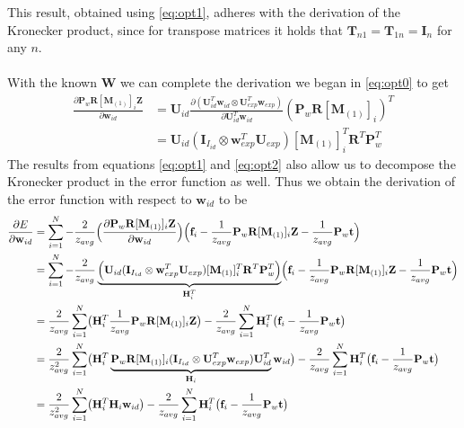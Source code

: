 \documentclass[11pt,a4paper,twoside]{report}
\begin{document}
This result, obtained using \ref{eq:opt1}, adheres with the derivation of
the Kronecker product, since for transpose matrices it holds that $\mathbf{T}_{n1} =
\mathbf{T}_{1n} = \mathbf{I}_n$ for any $n$.\\
\\
With the known $\mathbf{W}$ we can complete the derivation we began in \ref{eq:opt0} to get
\begin{align}
\frac
{\partial 
\mathbf{P}_w\mathbf{R}[\mathbf{M}_{(1)}]_{i}\mathbf{Z}
}
{\partial
\mathbf{w}_{id}
}
&=\mathbf{U}_{id}
\frac
{\partial
(\mathbf{U}_{id}^T\mathbf{w}_{id} \otimes \mathbf{U}_{exp}^T\mathbf{w}_{exp})
}
{\partial
\mathbf{U}_{id}^T\mathbf{w}_{id}
}
(\mathbf{P}_w\mathbf{R}[\mathbf{M}_{(1)}]_{i})^T\nonumber\\
&=
\mathbf{U}_{id}
(\mathbf{I}_{I_{id}} \otimes
\mathbf{w}_{exp}^T\mathbf{U}_{exp})
[\mathbf{M}_{(1)}]_{i}^T\mathbf{R}^T\mathbf{P}_w^T
\end{align}
The results from equations \ref{eq:opt1} and \ref{eq:opt2} also allow us to decompose the Kronecker product
in the error function as well. Thus we obtain the derivation of the error function with respect to
$\mathbf{w}_{id}$ to be
\begin{align*}\label{eq:opt4}
\frac{\partial E}{\partial \mathbf{w}_{id}} &= \sum_{i=1}^N -\frac{2}{z_{avg}}\Bigl(
\frac{\partial \mathbf{P}_w\mathbf{R}[\mathbf{M}_{(1)}]_{i}\mathbf{Z}}
{\partial \mathbf{w}_{id}}\Bigr)\Bigl(\mathbf{f}_i - \frac{1}{z_{avg}}\mathbf{P}_w\mathbf{R}[\mathbf{M}_{(1)}]_{i}\mathbf{Z} - \frac{1}{z_{avg}}\mathbf{P}_w\mathbf{t}\Bigr)\\
&=\sum_{i=1}^N -\frac{2}{z_{avg}}\underbrace{\Bigl(\mathbf{U}_{id} (\mathbf{I}_{I_{id}} \otimes \mathbf{w}_{exp}^T\mathbf{U}_{exp}) [\mathbf{M}_{(1)}]_{i}^T\mathbf{R}^T\mathbf{P}_w^T\Bigr)}_{\mathbf{H}_i^T}\Bigl(\mathbf{f}_i - \frac{1}{z_{avg}}\mathbf{P}_w\mathbf{R}[\mathbf{M}_{(1)}]_{i}\mathbf{Z} - \frac{1}{z_{avg}}\mathbf{P}_w\mathbf{t}
\Bigr)\\
&= \frac{2}{z_{avg}}\sum_{i=1}^N\bigl(
\mathbf{H}_i^T\frac{1}{z_{avg}}\mathbf{P}_w\mathbf{R}[\mathbf{M}_{(1)}]_{i}\mathbf{Z}\bigr)
-
\frac{2}{z_{avg}}\sum_{i=1}^N \mathbf{H}_i^T\bigl(\mathbf{f}_i - \frac{1}{z_{avg}}\mathbf{P}_w\mathbf{t}
\bigr)\\
&=
\frac{2}{z_{avg}^2}\sum_{i=1}^N\bigl(
\mathbf{H}_i^T\underbrace{\mathbf{P}_w\mathbf{R}[\mathbf{M}_{(1)}]_{i}(\mathbf{I}_{I_{id}} \otimes \mathbf{U}_{exp}^T\mathbf{w}_{exp})\mathbf{U}_{id}^T}_{\mathbf{H}_i}\mathbf{w}_{id}\bigr)
-
\frac{2}{z_{avg}}\sum_{i=1}^N \mathbf{H}_i^T\bigl(\mathbf{f}_i -
\frac{1}{z_{avg}}\mathbf{P}_w\mathbf{t}\bigr)\\
&=\frac{2}{z_{avg}^2}\sum_{i=1}^N\bigl(
\mathbf{H}_i^T\mathbf{H}_i\mathbf{w}_{id}\bigr)
-
\frac{2}{z_{avg}}\sum_{i=1}^N \mathbf{H}_i^T\bigl(\mathbf{f}_i -
\frac{1}{z_{avg}}\mathbf{P}_w\mathbf{t}\bigr)
\end{align*}
\end{document}
